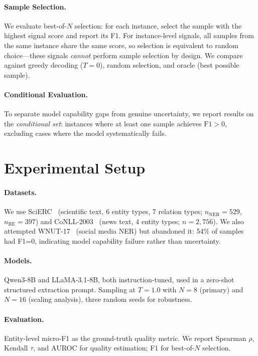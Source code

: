 \documentclass[11pt,a4paper]{article}
\begin{document}
\paragraph{Sample Selection.}
We evaluate best-of-$N$ selection: for each instance, select the sample with the highest signal score and report its F1.
For instance-level signals, all samples from the same instance share the same score, so selection is equivalent to random choice---these signals \emph{cannot} perform sample selection by design.
We compare against greedy decoding ($T{=}0$), random selection, and oracle (best possible sample).

\paragraph{Conditional Evaluation.}
To separate model capability gaps from genuine uncertainty, we report results on the \emph{conditional set}: instances where at least one sample achieves $\text{F1} > 0$, excluding cases where the model systematically fails.

\section{Experimental Setup}
\label{sec:setup}

\paragraph{Datasets.}
We use SciERC~\cite{luan2018scierc} (scientific text, 6 entity types, 7 relation types; $n_{\text{NER}}{=}529$, $n_{\text{RE}}{=}397$) and CoNLL-2003~\cite{tjong2003conll} (news text, 4 entity types; $n{=}2{,}756$).
We also attempted WNUT-17~\cite{derczynski2017wnut} (social media NER) but abandoned it: 54\% of samples had F1=0, indicating model capability failure rather than uncertainty.

\paragraph{Models.}
Qwen3-8B and LLaMA-3.1-8B, both instruction-tuned, used in a zero-shot structured extraction prompt.
Sampling at $T{=}1.0$ with $N{=}8$ (primary) and $N{=}16$ (scaling analysis), three random seeds for robustness.

\paragraph{Evaluation.}
Entity-level micro-F1 as the ground-truth quality metric.
We report Spearman $\rho$, Kendall $\tau$, and AUROC for quality estimation; F1 for best-of-$N$ selection.
\end{document}
